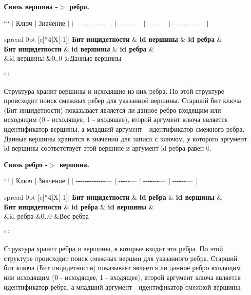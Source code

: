 \begin{DoxyEnumerate}
\item {\bfseries Связь вершина -\/$>$ ребро.}

``` $\vert$ Ключ $\vert$ Значение $\vert$ $\vert$ -\/-\/-\/-\/-\/-\/-\/-\/-\/-\/-\/-\/-\/--- $\vert$ -\/-\/-\/-\/-\/-\/-\/--- $\vert$ -\/-\/-\/-\/-\/--- $\vert$ -\/-\/-\/-\/-\/-\/-\/-\/-\/-\/-\/--- $\vert$ \tabulinesep=1mm
\begin{longtabu} spread 0pt [c]{*{4}{|X[-1]}|}
\hline
\rowcolor{\tableheadbgcolor}\textbf{ Бит инцидетности }&\textbf{ id вершины }&\textbf{ id ребра }&\textbf{ }\\
\endfirsthead
\hline
\endfoot
\hline
\rowcolor{\tableheadbgcolor}\textbf{ Бит инцидетности }&\textbf{ id вершины }&\textbf{ id ребра }&\textbf{ }\\
 &id вершины &0..0 &Данные вершины \\
\end{longtabu}
```

Структура хранит вершины и исходящие из них ребра. По этой структуре происходит поиск смежных ребер для указанной вершины. Старший бит ключа ({\ttfamily Бит инцидетности}) показывает является ли данное ребро входящим или исходящим (0 -\/ исходящее, 1 -\/ входящее), второй аргумент ключа является идентификатор вершины, а младший аргумент -\/ идентификатор смежного ребра. Данные вершины хранится в значении для записи с ключом, у которого аргумент {\ttfamily id вершины} соответствует этой вершине и аргумент {\ttfamily id ребра} равен 0.
\item {\bfseries Связь ребро -\/$>$ вершина.}

``` $\vert$ Ключ $\vert$ Значение $\vert$ $\vert$ -\/-\/-\/-\/-\/-\/-\/-\/-\/-\/-\/-\/-\/--- $\vert$ -\/-\/-\/-\/-\/--- $\vert$ -\/-\/-\/-\/-\/-\/-\/--- $\vert$ -\/-\/-\/-\/-\/-\/--- $\vert$ \tabulinesep=1mm
\begin{longtabu} spread 0pt [c]{*{4}{|X[-1]}|}
\hline
\rowcolor{\tableheadbgcolor}\textbf{ Бит инцидетности }&\textbf{ id ребра }&\textbf{ id вершины }&\textbf{ }\\
\endfirsthead
\hline
\endfoot
\hline
\rowcolor{\tableheadbgcolor}\textbf{ Бит инцидетности }&\textbf{ id ребра }&\textbf{ id вершины }&\textbf{ }\\
 &id ребра &0..0 &Вес ребра \\
\end{longtabu}
```

Структура хранит ребра и вершины, в которые входят эти ребра. По этой структуре происходит поиск смежных вершин для указанного ребра. Старший бит ключа ({\ttfamily Бит инцидетности}) показывает является ли данное ребро входящим или исходящим (0 -\/ исходящее, 1 -\/ входящее), второй аргумент ключа является идентификатор ребра, а младший аргумент -\/ идентификатор смежной вершины.


\end{DoxyEnumerate}
